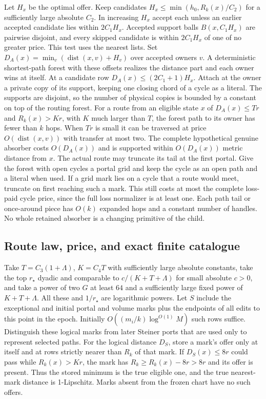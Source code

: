 \documentclass[11pt]{article}
\begin{document}
Let \(H_x\) be the optimal offer. Keep candidates \(H_x\le\min(h_0,R_k(x)/C_2)\) for a sufficiently large absolute \(C_2\). In increasing \(H_x\) accept each unless an earlier accepted candidate lies within \(2C_1 H_x\). Accepted support balls \(B(x,C_1 H_x)\) are pairwise disjoint, and every skipped candidate is within \(2C_1 H_x\) of one of no greater price. This test uses the nearest lists. Set \(D_A(x)=\min_v(\operatorname{dist}(x,v)+H_v)\) over accepted owners \(v\). A deterministic shortest-path forest with these offsets realizes the distance part and each owner wins at itself. At a candidate row \(D_A(x)\le(2C_1+1)H_x\). Attach at the owner a private copy of its support, keeping one closing chord of a cycle as a literal. The supports are disjoint, so the number of physical copies is bounded by a constant on top of the routing forest. For a route from an eligible state \(x\) of \(D_A(x)\le T r\) and \(R_k(x)>K r\), with \(K\) much larger than \(T\), the forest path to its owner has fewer than \(k\) hops. When \(Tr\) is small it can be traversed at price \(O(\operatorname{dist}(x,v))\) with transfer at most two. The complete hypothetical genuine absorber costs \(O(D_A(x))\) and is supported within \(O(D_A(x))\) metric distance from \(x\). The actual route may truncate its tail at the first portal. Give the forest with open cycles a portal grid and keep the cycle as an open path and a literal when used. If a grid mark lies on a cycle that a route would meet, truncate on first reaching such a mark. This still costs at most the complete loss-paid cycle price, since the full loss normalizer is at least one. Each path tail or once-around piece has \(O(k)\) expanded hops and a constant number of handles. No whole retained absorber is a changing primitive of the child.

\hypertarget{route-law-price-and-exact-finite-catalogue}{%
\subsection{Route law, price, and exact finite catalogue}\label{route-law-price-and-exact-finite-catalogue}}

Take \(T=C_3(1+\Lambda)\), \(K=C_4T\) with sufficiently large absolute constants, take the top \(r_\star\) dyadic and comparable to \(c/(K+T+\Lambda)\) for small absolute \(c>0\), and take a power of two \(G\) at least \(64\) and a sufficiently large fixed power of \(K+T+\Lambda\). All these and \(1/r_\star\) are logarithmic powers. Let \(S\) include the exceptional and initial portal and volume marks plus the endpoints of all edits to this point in the epoch. Initially \(O((m_i/k)\log^{O(1)}M)\) such rows suffice. Distinguish these logical marks from later Steiner ports that are used only to represent selected paths. For the logical distance \(D_S\), store a mark's offer only at itself and at rows strictly nearer than \(R_k\) of that mark. If \(D_S(x)\le8r\) could pass while \(R_k(x)>K r\), the mark has \(R_k\ge R_k(x)-8r>8r\) and its offer is present. Thus the stored minimum is the true eligible one, and the true nearest-mark distance is 1-Lipschitz. Marks absent from the frozen chart have no such offers.
\end{document}
